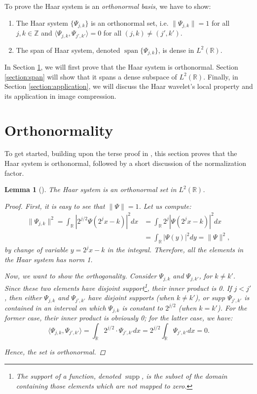 \documentclass[11pt]{amsart}
\theoremstyle{theorem} %
\newtheorem{lem}[thm]{Lemma} %
\theoremstyle{definition}
\theoremstyle{example}
\theoremstyle{remark}
\numberwithin{equation}{section}
\newcommand{\R}{\mathbb{R}}
\newcommand{\Z}{\mathbb{Z}}
\DeclareMathOperator*{\supp}{supp}
\DeclareMathOperator{\spn}{span}
\begin{document}
To prove the Haar system is an \textit{orthonormal basis}, we have to show:
	\begin{enumerate}
		\item The Haar system $ \{ \varPsi_{j,k} \} $ is an orthonormal set, i.e. $ \| \varPsi_{j,k} \| = 1 $ for all $ j,k \in \Z $ and $ \langle \varPsi_{j,k}, \varPsi_{j',k'} \rangle = 0 $ for all $ (j,k) \neq (j',k') $.
		
		\item The span of Haar system, denoted $ \spn\{\varPsi_{j,k}\} $, is dense in $ L^2(\R) $.
	\end{enumerate}

In Section \ref{section:orthonormality}, we will first prove that the Haar system is orthonormal. Section \ref{section:span} will show that it spans a dense subspace of  $ L^2(\R) $. Finally, in Section \ref{section:application}, we will discuss the Haar wavelet's local property and its application in image compression.

\section{Orthonormality} \label{section:orthonormality}
To get started, building upon the terse proof in  \cite{davidson}, this section proves that the Haar system is orthonormal, followed by a short discussion of the normalization factor.

\begin{lem}[{\cite[409]{davidson}}] \label{lem:orthonormal}
	The Haar system is an orthonormal set in $ L^2(\R) $.
	
	\begin{proof}
		First, it is easy to see that $ \| \varPsi \| = 1 $. Let us compute:
		\begin{align*}
		\| \varPsi_{j,k} \|^2 = \int_{\R} \left| 2^{j/2} \varPsi(2^{j} x - k) \right|^2 dx 
		&=   \int_{\R} 2^j \left| \varPsi(2^{j} x - k) \right|^2 dx \\
		&= \int_{\R} \left| \varPsi(y) \right|^2 dy
		= \| \varPsi \|^2,
		\end{align*}
		by change of variable $ y = 2^{j}x-k $ in the integral. Therefore, all the elements in the Haar system has norm 1.
		
		Now, we want to show the orthogonality. Consider $ \varPsi_{j,k} $ and $ \varPsi_{j,k'} $, for $ k \neq k' $. Since these two elements have disjoint support\footnote{The \emph{support} of a function, denoted $ \supp $, is the subset of the domain containing those elements which are not mapped to zero.}, their inner product is 0. If $ j < j' $, then either $ \varPsi_{j,k} $ and $ \varPsi_{j',k'} $ have disjoint supports (when $ k \neq k' $), or supp $ \varPsi_{j',k'} $ is contained in an interval on which $ \varPsi_{j,k} $ is constant to $ 2^{j/2} $ (when $ k = k' $). For the former case, their inner product is obviously 0; for the latter case, we have:
		\[ \langle \varPsi_{j,k}, \varPsi_{j',k'} \rangle =  \int_{\R} 2^{j/2} \cdot \varPsi_{j',k'} dx = 2^{j/2} \int_{\R} \varPsi_{j',k'} dx = 0. \]
	
		Hence, the set is orthonormal.
	\end{proof}
\end{lem}
\end{document}
